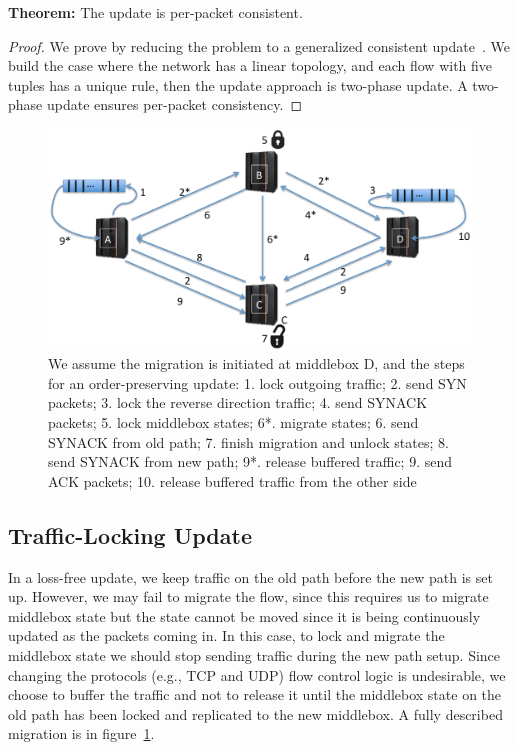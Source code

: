 \textbf{Theorem:} 
The update is per-packet consistent. 

\begin{proof}
We prove by reducing the problem to a generalized consistent update~\cite{consistentupdate}. We build the case where the network has a linear topology, and each flow with five tuples has a unique rule, then the update approach is two-phase update. A two-phase update ensures per-packet consistency. 
 
\end{proof}

\begin{figure}[ht]
\centering
\includegraphics[width=\linewidth]{figures/order_preserving.png} 

\caption{\small We assume the migration is initiated at middlebox D, and the steps for an order-preserving update: 1. lock outgoing traffic; 2. send SYN packets; 3. lock the reverse direction traffic; 4. send SYNACK packets; 5. lock middlebox states; 6*. migrate states; 6. send SYNACK from old path; 7. finish migration and unlock states; 8. send SYNACK from new path; 9*. release buffered traffic; 9. send ACK packets; 10. release buffered traffic from the other side}\label{orderpreserving}
\end{figure}

\subsection{Traffic-Locking Update}

In a loss-free update, we keep traffic on the old path before the new path is set up. However, we may fail to migrate the flow, since this requires us to migrate middlebox state but the state cannot be moved since it is being continuously updated as the packets coming in. In this case, to lock and migrate the middlebox state we should stop sending traffic during the new path setup. Since changing the protocols (e.g., TCP and UDP) flow control logic is undesirable, we choose to buffer the traffic and not to release it until the middlebox state on the old path has been locked and replicated to the new middlebox. A fully described migration is in figure~\ref{orderpreserving}.


